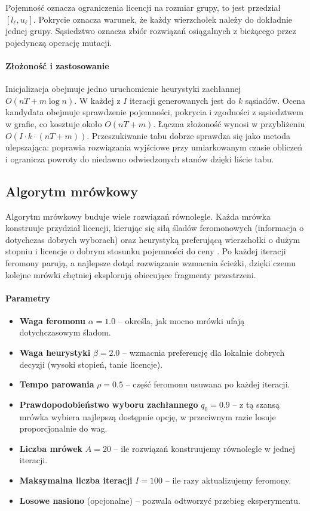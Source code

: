 Pojemność oznacza ograniczenia licencji na rozmiar grupy, to jest przedział \([l_\ell,u_\ell]\). Pokrycie oznacza warunek, że każdy wierzchołek należy do dokładnie jednej grupy. Sąsiedztwo oznacza zbiór rozwiązań osiągalnych z bieżącego przez pojedynczą operację mutacji.

\paragraph{Złożoność i zastosowanie}
Inicjalizacja obejmuje jedno uruchomienie heurystyki zachłannej \(O(nT + m\log n)\). W każdej z \(I\) iteracji generowanych jest do \(k\) sąsiadów. Ocena kandydata obejmuje sprawdzenie pojemności, pokrycia i zgodności z sąsiedztwem w grafie, co kosztuje około \(O(nT + m)\). Łączna złożoność wynosi w przybliżeniu \(O\!\left(I \cdot k \cdot (nT + m)\right)\). Przeszukiwanie tabu dobrze sprawdza się jako metoda ulepszająca: poprawia rozwiązania wyjściowe przy umiarkowanym czasie obliczeń i ogranicza powroty do niedawno odwiedzonych stanów dzięki liście tabu.

\subsection{Algorytm mrówkowy}\label{subsec:aco}
Algorytm mrówkowy buduje wiele rozwiązań równolegle. Każda mrówka konstruuje przydział licencji, kierując się siłą śladów feromonowych (informacja o dotychczas dobrych wyborach) oraz heurystyką preferującą wierzchołki o dużym stopniu i licencje o dobrym stosunku pojemności do ceny \cite{dorigo1997}. Po każdej iteracji feromony parują, a najlepsze dotąd rozwiązanie wzmacnia ścieżki, dzięki czemu kolejne mrówki chętniej eksplorują obiecujące fragmenty przestrzeni.

\paragraph{Parametry}
\begin{itemize}
  \item \textbf{Waga feromonu} $\alpha=1.0$ -- określa, jak mocno mrówki ufają dotychczasowym śladom.
  \item \textbf{Waga heurystyki} $\beta=2.0$ -- wzmacnia preferencję dla lokalnie dobrych decyzji (wysoki stopień, tanie licencje).
  \item \textbf{Tempo parowania} $\rho=0.5$ -- część feromonu usuwana po każdej iteracji.
  \item \textbf{Prawdopodobieństwo wyboru zachłannego} $q_0=0.9$ -- z tą szansą mrówka wybiera najlepszą dostępnie opcję, w przeciwnym razie losuje proporcjonalnie do wag.
  \item \textbf{Liczba mrówek} $A=20$ -- ile rozwiązań konstruujemy równolegle w jednej iteracji.
  \item \textbf{Maksymalna liczba iteracji} $I=100$ -- ile razy aktualizujemy feromony.
  \item \textbf{Losowe nasiono} (opcjonalne) -- pozwala odtworzyć przebieg eksperymentu.
\end{itemize}


